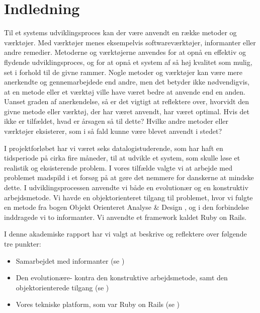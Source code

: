 \chapter{Indledning}

Til et systems udviklingsproces kan der være anvendt en række metoder og værktøjer. Med værktøjer menes eksempelvis softwareværktøjer, informanter eller andre remedier. Metoderne og værktøjerne anvendes for at opnå en effektiv og flydende udviklingsproces, og for at opnå et system af så høj kvalitet som mulig, set i forhold til de givne rammer. Nogle metoder og værktøjer kan være mere anerkendte og gennemarbejdede end andre, men det betyder ikke nødvendigvis, at en metode eller et værktøj ville have været bedre at anvende end en anden. Uanset graden af anerkendelse, så er det vigtigt at reflektere over, hvorvidt den givne metode eller værktøj, der har været anvendt, har været optimal. Hvis det ikke er tilfældet, hvad er årsagen så til dette? Hvilke andre metoder eller værktøjer eksisterer, som i så fald kunne være blevet anvendt i stedet?

I projektforløbet har vi været seks datalogistuderende, som har haft en tidsperiode på cirka fire måneder, til at udvikle et system, som skulle løse et realistik og eksisterende problem. I vores tilfælde valgte vi at arbejde med problemet madspild i et forsøg på at gøre det nemmere for danskerne at mindske dette. I udviklingsprocessen anvendte vi både en evolutionær og en konstruktiv arbejdsmetode. Vi havde en objektorienteret tilgang til problemet, hvor vi fulgte en metode fra bogen Objekt Orienteret Analyse \& Design \cite{ooad}, og i den forbindelse inddragede vi to informanter. Vi anvendte et framework kaldet Ruby on Rails. 

I denne akademiske rapport har vi valgt at beskrive og reflektere over følgende tre punkter:

\begin{itemize}[noitemsep]
  \item Samarbejdet med informanter (se )
  \item Den evolutionære- kontra den konstruktive arbejdsmetode, samt den objektorienterede tilgang (se )
  \item Vores tekniske platform, som var Ruby on Rails (se )
\end{itemize}

